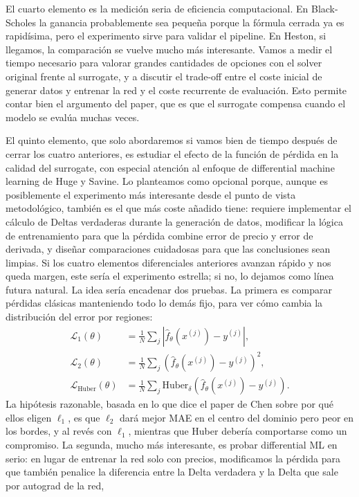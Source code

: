 \documentclass[11pt,a4paper]{article}
\begin{document}
El cuarto elemento es la medición seria de eficiencia computacional. En Black-Scholes la ganancia probablemente sea pequeña porque la fórmula cerrada ya es rapidísima, pero el experimento sirve para validar el pipeline. En Heston, si llegamos, la comparación se vuelve mucho más interesante. Vamos a medir el tiempo necesario para valorar grandes cantidades de opciones con el solver original frente al surrogate, y a discutir el trade-off entre el coste inicial de generar datos y entrenar la red y el coste recurrente de evaluación. Esto permite contar bien el argumento del paper, que es que el surrogate compensa cuando el modelo se evalúa muchas veces.

El quinto elemento, que solo abordaremos si vamos bien de tiempo después de cerrar los cuatro anteriores, es estudiar el efecto de la función de pérdida en la calidad del surrogate, con especial atención al enfoque de differential machine learning de Huge y Savine. Lo planteamos como opcional porque, aunque es posiblemente el experimento más interesante desde el punto de vista metodológico, también es el que más coste añadido tiene: requiere implementar el cálculo de Deltas verdaderas durante la generación de datos, modificar la lógica de entrenamiento para que la pérdida combine error de precio y error de derivada, y diseñar comparaciones cuidadosas para que las conclusiones sean limpias. Si los cuatro elementos diferenciales anteriores avanzan rápido y nos queda margen, este sería el experimento estrella; si no, lo dejamos como línea futura natural. La idea sería encadenar dos pruebas. La primera es comparar pérdidas clásicas manteniendo todo lo demás fijo, para ver cómo cambia la distribución del error por regiones:
\begin{align}
\mathcal{L}_{1}(\theta) &= \tfrac{1}{N} \textstyle\sum_j |\hat{f}_\theta(x^{(j)}) - y^{(j)}|, \\
\mathcal{L}_{2}(\theta) &= \tfrac{1}{N} \textstyle\sum_j (\hat{f}_\theta(x^{(j)}) - y^{(j)})^2, \\
\mathcal{L}_{\mathrm{Huber}}(\theta) &= \tfrac{1}{N} \textstyle\sum_j \mathrm{Huber}_\delta\!\left(\hat{f}_\theta(x^{(j)}) - y^{(j)}\right).
\end{align}
La hipótesis razonable, basada en lo que dice el paper de Chen sobre por qué ellos eligen $\ell_1$, es que $\ell_2$ dará mejor MAE en el centro del dominio pero peor en los bordes, y al revés con $\ell_1$, mientras que Huber debería comportarse como un compromiso. La segunda, mucho más interesante, es probar differential ML en serio: en lugar de entrenar la red solo con precios, modificamos la pérdida para que también penalice la diferencia entre la Delta verdadera y la Delta que sale por autograd de la red,
\end{document}
